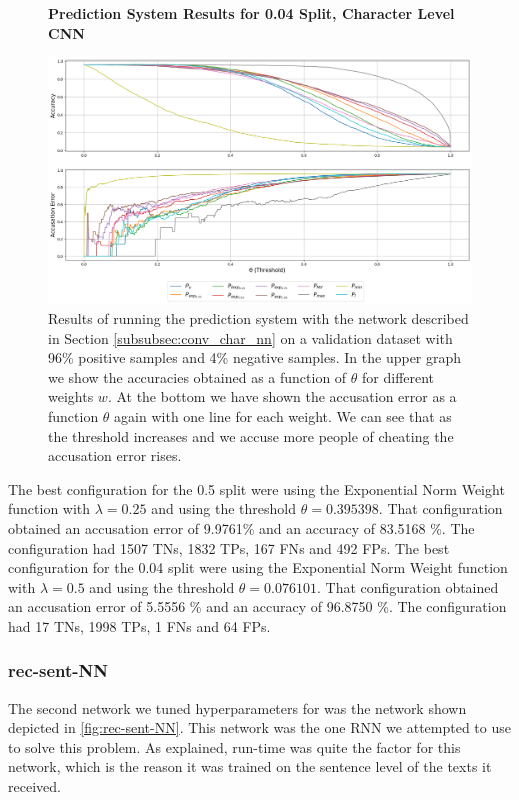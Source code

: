 \begin{figure}
    \centering
    \textbf{Prediction System Results for 0.04 Split, Character Level CNN}\par\medskip
    \includegraphics[scale=0.35]{./pictures/experiments/conv_char_nn/prediction_system_04.png}
    \caption{Results of running the prediction system with the network described
        in Section \ref{subsubsec:conv_char_nn} on a validation dataset with
        96\% positive samples and 4\% negative samples. In the upper graph we
        show the accuracies obtained as a function of $\theta$ for different
        weights $w$. At the bottom we have shown the accusation error as a
        function $\theta$ again with one line for each weight. We can see that
        as the threshold increases and we accuse more people of cheating the
        accusation error rises.}
    \label{fig:conv-char-NN-pred-4}
\end{figure}

The best configuration for the 0.5 split were using the Exponential Norm Weight
function with $\lambda = 0.25$ and using the threshold $\theta = 0.395398$.
That configuration obtained an accusation error of 9.9761\% and an accuracy of
83.5168 \%. The configuration had 1507 \gls{TN}s, 1832 \gls{TP}s, 167 \gls{FN}s
and 492 \gls{FP}s. The best configuration for the 0.04 split were using the
Exponential Norm Weight function with $\lambda = 0.5$ and using the threshold
$\theta = 0.076101$. That configuration obtained an accusation error of 5.5556
\% and an accuracy of 96.8750 \%. The configuration had 17 \gls{TN}s, 1998
\gls{TP}s, 1 \gls{FN}s and 64 \gls{FP}s.

\subsubsection{\glsdesc{rec-sent-NN}}
The second network we tuned hyperparameters for was the network shown
depicted in \ref{fig:rec-sent-NN}. This network was the one \gls{RNN}
we attempted to use to solve this problem. As explained, run-time
was quite the factor for this network, which is the reason it was
trained on the sentence level of the texts it received.

